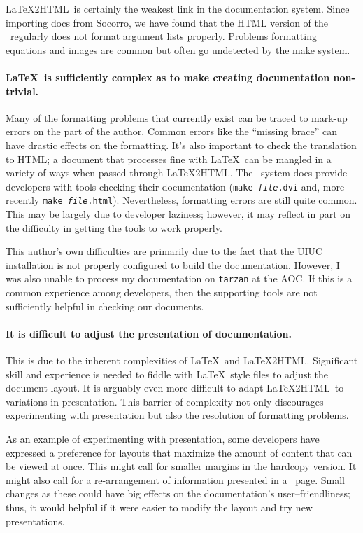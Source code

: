 \LaTeX2HTML\ is certainly the weakest link in the documentation
system.   Since importing docs from Socorro, we have found that
the HTML version of the \ regularly does not format
argument lists properly.  Problems formatting equations and images are
common but often go undetected by the make system.  

\paragraph{\LaTeX\ is sufficiently complex as to make creating
documentation non-trivial.}  Many of the formatting problems that
currently exist can be traced to mark-up errors on the part of the
author.  Common errors like the ``missing brace'' can have drastic
effects on the formatting.  It's also important to check the
translation to HTML; a document that processes fine with \LaTeX\ can
be mangled in a variety of ways when passed through \LaTeX2HTML.  The
\aipspp\ system does provide developers with tools checking their
documentation ({\tt make {\it file}.dvi} and, more recently {\tt make
{\it file}.html}).  Nevertheless, formatting errors are still quite
common.  This may be largely due to developer laziness; however, it
may reflect in part on the difficulty in getting the tools to work
properly.

This author's own difficulties are primarily due to the fact that the
UIUC installation is not properly configured to build the
documentation.  However, I was also unable to process my documentation
on {\tt tarzan} at the AOC.  If this is a common experience among
developers, then the supporting tools are not sufficiently helpful in
checking our documents.  

\paragraph{It is difficult to adjust the presentation of
documentation.}  This is due to the inherent complexities of \LaTeX\
and \LaTeX2HTML.  Significant skill and experience is needed to
fiddle with \LaTeX\ style files to adjust the document layout.  It is
arguably even more difficult to adapt \LaTeX2HTML\ to variations in
presentation.  This barrier of complexity not only discourages
experimenting with presentation but also the resolution of formatting
problems.  

As an example of experimenting with presentation, some developers have
expressed a preference for layouts that maximize the amount of content
that can be viewed at once.  This might call for smaller margins in
the hardcopy version.  It might also call for a re-arrangement of
information presented in a \refman\ page.  Small changes as these
could have big effects on the documentation's user--friendliness;
thus, it would helpful if it were easier to modify the layout and try
new presentations.

